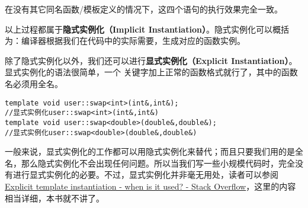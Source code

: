 在没有其它同名函数/模板定义的情况下，这四个语句的执行效果完全一致。\par
以上过程都属于\textbf{隐式实例化（Implicit Instantiation）}。隐式实例化可以概括为：编译器根据我们在代码中的实际需要，生成对应的函数实例。\par
除了隐式实例化以外，我们还可以进行\textbf{显式实例化（Explicit Instantiation）}。显式实例化的语法很简单，一个 \lstinline@template@ 关键字加上正常的函数格式就行了，其中的函数名必须用全名。
\begin{lstlisting}
template void user::swap<int>(int&,int&);
//显式实例化user::swap<int>(int&,int&)
template void user::swap<double>(double&,double&);
//显式实例化user::swap<double>(double&,double&)
\end{lstlisting}\par
一般来说，显式实例化的工作都可以用隐式实例化来替代；而且只要我们用的是全名，那么隐式实例化不会出现任何问题。所以当我们写一些小规模代码时，完全没有进行显式实例化的必要。不过，显式实例化并非毫无用处，读者可以参阅\href{https://stackoverflow.com/q/2351148/22112284}{Explicit template instantiation - when is it used? - Stack Overflow}，这里的内容相当详细，本书就不讲了。\par
